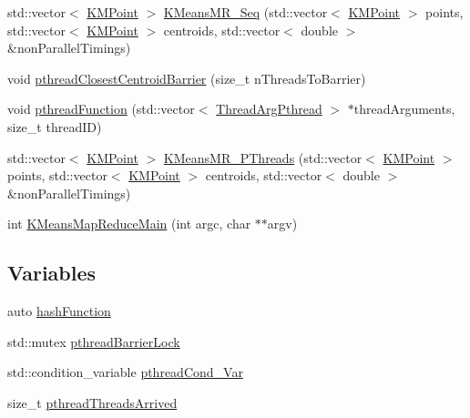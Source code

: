 \begin{DoxyCompactItemize}
\item 
std\-::vector$<$ \hyperlink{classKMeans__MapReduce_1_1KMPoint}{K\-M\-Point} $>$ \hyperlink{namespaceKMeans__MapReduce_ab76faaf9ab0206e28cb35c0860b219b1}{K\-Means\-M\-R\-\_\-\-Seq} (std\-::vector$<$ \hyperlink{classKMeans__MapReduce_1_1KMPoint}{K\-M\-Point} $>$ points, std\-::vector$<$ \hyperlink{classKMeans__MapReduce_1_1KMPoint}{K\-M\-Point} $>$ centroids, std\-::vector$<$ double $>$ \&non\-Parallel\-Timings)
\item 
void \hyperlink{namespaceKMeans__MapReduce_a632d36f6513159007c31a6869e979cf1}{pthread\-Closest\-Centroid\-Barrier} (size\-\_\-t n\-Threads\-To\-Barrier)
\item 
void \hyperlink{namespaceKMeans__MapReduce_a9ac8528832a61e437d66b2a509a3bdc1}{pthread\-Function} (std\-::vector$<$ \hyperlink{classKMeans__MapReduce_1_1ThreadArgPthread}{Thread\-Arg\-Pthread} $>$ $\ast$thread\-Arguments, size\-\_\-t thread\-I\-D)
\item 
std\-::vector$<$ \hyperlink{classKMeans__MapReduce_1_1KMPoint}{K\-M\-Point} $>$ \hyperlink{namespaceKMeans__MapReduce_a86bdd3f5df87711d559cfa1c1436bfca}{K\-Means\-M\-R\-\_\-\-P\-Threads} (std\-::vector$<$ \hyperlink{classKMeans__MapReduce_1_1KMPoint}{K\-M\-Point} $>$ points, std\-::vector$<$ \hyperlink{classKMeans__MapReduce_1_1KMPoint}{K\-M\-Point} $>$ centroids, std\-::vector$<$ double $>$ \&non\-Parallel\-Timings)
\item 
int \hyperlink{namespaceKMeans__MapReduce_a5c531cc24319a88d56ba5d6671b55679}{K\-Means\-Map\-Reduce\-Main} (int argc, char $\ast$$\ast$argv)
\end{DoxyCompactItemize}
\subsection*{Variables}
\begin{DoxyCompactItemize}
\item 
auto \hyperlink{namespaceKMeans__MapReduce_adb399ee1c151b183ed1956ad1bfc2f18}{hash\-Function}
\item 
std\-::mutex \hyperlink{namespaceKMeans__MapReduce_abe48c6fe313eab1688c8243ef5c3a02b}{pthread\-Barrier\-Lock}
\item 
std\-::condition\-\_\-variable \hyperlink{namespaceKMeans__MapReduce_adc5383b10499ff2b0a302bb26c40f004}{pthread\-Cond\-\_\-\-Var}
\item 
size\-\_\-t \hyperlink{namespaceKMeans__MapReduce_a3ebc17582a2928c65c8196cf5284ff79}{pthread\-Threads\-Arrived}
\end{DoxyCompactItemize}


